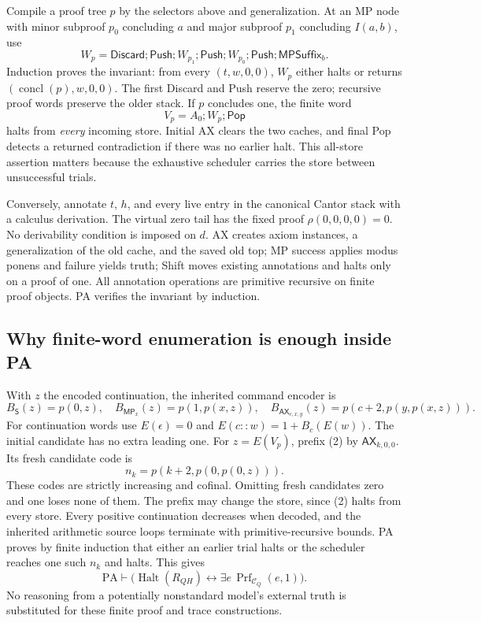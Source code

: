 \documentclass[11pt,letterpaper]{article}
\newcommand{\PA}{\mathrm{PA}}
\newcommand{\Halt}{\operatorname{Halt}}
\newcommand{\Prf}{\operatorname{Prf}}
\newcommand{\AX}{\mathsf{AX}}
\newcommand{\MP}{\mathsf{MP}}
\newcommand{\Shift}{\mathsf S}
\newcommand{\Push}{\mathsf{Push}}
\newcommand{\Pop}{\mathsf{Pop}}
\newcommand{\Discard}{\mathsf{Discard}}
\begin{document}
Compile a proof tree $p$ by the selectors above and generalization. At an
MP node with minor subproof $p_0$ concluding $a$ and major subproof $p_1$
concluding $I(a,b)$, use
\[
 W_p=\Discard;\Push;W_{p_1};\Push;W_{p_0};\Push;\mathsf{MPSuffix}_b.
\]
Induction proves the invariant: from every $(t,w,0,0)$, $W_p$ either halts
or returns $(\operatorname{concl}(p),w,0,0)$. The first Discard and Push
reserve the zero; recursive proof words preserve the older stack.
If $p$ concludes one, the finite word
\[
       V_p=A_0;W_p;\Pop
\tag{2}
\]
halts from \emph{every} incoming store. Initial AX clears the two caches,
and final Pop detects a returned contradiction if there was no earlier
halt. This all-store assertion matters because the exhaustive scheduler
carries the store between unsuccessful trials.

Conversely, annotate $t$, $h$, and every live entry in the canonical
Cantor stack with a calculus derivation. The virtual zero tail has the
fixed proof $\rho(0,0,0,0)=0$. No derivability condition is imposed on $d$.
AX creates axiom instances, a generalization of the old cache, and the
saved old top; MP success applies modus ponens and failure yields truth;
Shift moves existing annotations and halts only on a proof of one. All
annotation operations are primitive recursive on finite proof objects.
PA verifies the invariant by induction.

\subsection{Why finite-word enumeration is enough inside PA}
With $z$ the encoded continuation, the inherited command encoder is
\[
 B_{\Shift}(z)=p(0,z),\quad B_{\MP_x}(z)=p(1,p(x,z)),\quad
 B_{\AX_{c,x,y}}(z)=p(c+2,p(y,p(x,z))).
\]
For continuation words use $E(\epsilon)=0$ and
$E(c::w)=1+B_c(E(w))$. The initial candidate has no extra leading one.
For $z=E(V_p)$, prefix (2) by $\AX_{k,0,0}$. Its fresh candidate code is
\[
                  n_k=p(k+2,p(0,p(0,z))).
\]
These codes are strictly increasing and cofinal. Omitting fresh candidates
zero and one loses none of them. The prefix may change the store, since
(2) halts from every store. Every positive continuation decreases when
decoded, and the inherited arithmetic source loops terminate with
primitive-recursive bounds. PA proves by finite induction that either an
earlier trial halts or the scheduler reaches one such $n_k$ and halts.
This gives
\[
 \PA\vdash\bigl(\Halt(R_{QH})
       \leftrightarrow\exists e\,\Prf_{\mathcal C_Q}(e,1)\bigr).
\tag{3}
\]
No reasoning from a potentially nonstandard model's external truth is
substituted for these finite proof and trace constructions.
\end{document}
